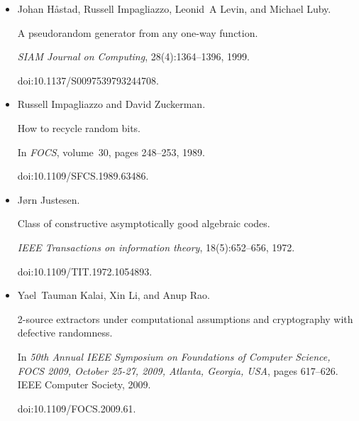 \documentclass[10pt,a4paper]{article}
\begin{document}
\begin{itemize}
Venkatesan Guruswami and Atri Rudra.


Explicit codes achieving list decoding capacity: Error-correction
with optimal redundancy.


\emph{IEEE Transactions on Information Theory}, 54(1):135–150, 2008.


doi:10.1109/TIT.2007.911222.





\item[] 
[20]

Johan Håstad, Russell Impagliazzo, Leonid A Levin, and Michael Luby.


A pseudorandom generator from any one-way function.


\emph{SIAM Journal on Computing}, 28(4):1364–1396, 1999.


doi:10.1137/S0097539793244708.





\item[] 
[21]

Russell Impagliazzo and David Zuckerman.


How to recycle random bits.


In \emph{FOCS}, volume 30, pages 248–253, 1989.


doi:10.1109/SFCS.1989.63486.





\item[] 
[22]

Jørn Justesen.


Class of constructive asymptotically good algebraic codes.


\emph{IEEE Transactions on information theory}, 18(5):652–656, 1972.


doi:10.1109/TIT.1972.1054893.





\item[] 
[23]

Yael Tauman Kalai, Xin Li, and Anup Rao.


2-source extractors under computational assumptions and cryptography
with defective randomness.


In \emph{50th Annual IEEE Symposium on Foundations of Computer
Science, FOCS 2009, October 25-27, 2009, Atlanta, Georgia, USA}, pages
617–626. IEEE Computer Society, 2009.


doi:10.1109/FOCS.2009.61.






\end{itemize}
\end{document}
